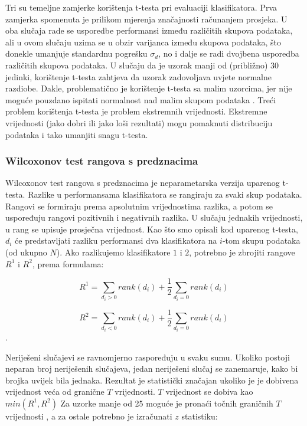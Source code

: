 Tri su temeljne zamjerke korištenja t-testa pri evaluaciji klasifikatora. Prva zamjerka spomenuta je prilikom mjerenja značajnosti računanjem prosjeka. U oba slučaja rade se usporedbe performansi između različitih skupova podataka, ali u ovom slučaju uzima se u obzir varijanca između skupova podataka, što donekle umanjuje standardnu pogrešku $\sigma_d$, no i dalje se radi dvojbena usporedba različitih skupova podataka. U slučaju da je uzorak manji od (približno) 30 jedinki, korištenje t-testa zahtjeva da uzorak zadovoljava uvjete normalne razdiobe. Dakle, problematično je korištenje t-testa sa malim uzorcima, jer nije moguće pouzdano ispitati normalnost nad malim skupom podataka \citep{razali2011power}. Treći problem korištenja t-testa je problem ekstremnih vrijednosti. Ekstremne vrijednosti (jako dobri ili jako loši rezultati) mogu pomaknuti distribuciju podataka i tako umanjiti snagu t-testa.

\subsubsection{Wilcoxonov test rangova s predznacima}

Wilcoxonov test rangova s predznacima \citep{wilcoxon1945individual} je neparametarska verzija uparenog t-testa. Razlike u performansama klasifikatora se rangiraju za svaki skup podataka. Rangovi se formiraju prema apsolutnim vrijednostima razlika, a potom se uspoređuju rangovi pozitivnih i negativnih razlika. U slučaju jednakih vrijednosti, u rang se upisuje prosječna vrijednost. Kao što smo opisali kod uparenog t-testa, $d_i$ će predstavljati razliku performansi dva klasifikatora na $i$-tom skupu podataka (od ukupno $N$). Ako razlikujemo klasifikatore $1$ i $2$, potrebno je zbrojiti rangove $R^1$ i $R^2$, prema formulama:

$$ R^1 = \sum_{d_i>0} rank(d_i) + \frac{1}{2} \sum_{d_i=0} rank(d_i) $$

$$ R^2 = \sum_{d_i<0} rank(d_i) + \frac{1}{2} \sum_{d_i=0} rank(d_i) $$.

Neriješeni slučajevi se ravnomjerno raspoređuju u svaku sumu. Ukoliko postoji neparan broj neriješenih slučajeva, jedan neriješeni slučaj se zanemaruje, kako bi brojka uvijek bila jednaka. Rezultat je statistički značajan ukoliko je je dobivena vrijednost veća od granične $T$ vrijednosti. $T$ vrijednost se dobiva kao $min(R^1, R^2)$ 
Za uzorke manje od 25 moguće je pronaći točnih graničnih $T$ vrijednosti \citep{wilcoxon1973critical}, a za ostale potrebno je izračunati $z$ statistiku:

